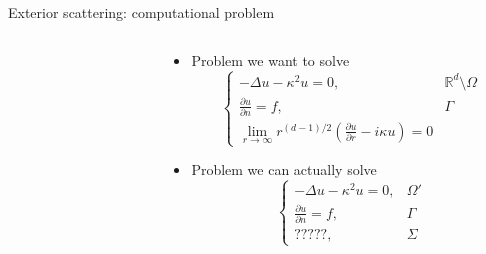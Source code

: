 \documentclass{beamer}
\begin{document}
\begin{frame}{Exterior scattering: computational problem}
    \begin{columns}
    \begin{column}{0.45\textwidth}
        \begin{figure}[ht]
        \begin{center}
        \end{center}
        \end{figure}
    \end{column}
    \begin{column}{0.55\textwidth}
        \begin{itemize}
            \item<1-> Problem we want to solve
            \[
                \begin{cases}
                    -\Delta u - \kappa^2 u = 0, &  \mathbb R^d\setminus\Omega \\
                    \frac{\partial u}{\partial n} = f, & \Gamma \\
                    \lim_{r\to\infty} r^{(d-1)/2}
                        \left(\tfrac{\partial u}{\partial r} - i\kappa u\right)
                = 0
                \end{cases}
            \]
            \item<2-> Problem we can actually solve
            \[
                \begin{cases}
                    -\Delta u - \kappa^2 u = 0, & \Omega' \\
                    \frac{\partial u}{\partial n} = f, & \Gamma \\
                    ?????, & \Sigma
                \end{cases}
            \]
        \end{itemize}
    \end{column}
    \end{columns}
\end{frame}
\end{document}
